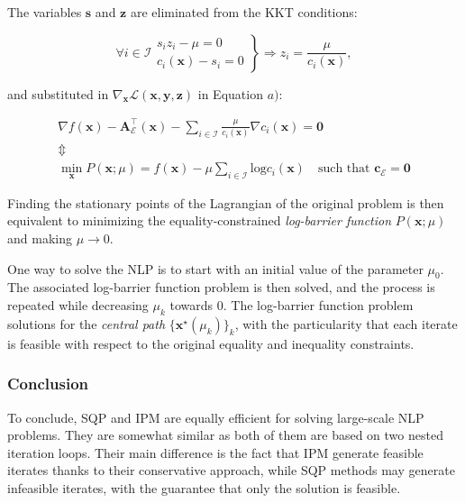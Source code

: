 The variables $\mathbf{s}$ and $\mathbf{z}$ are eliminated from the
KKT conditions:

\begin{equation}
\forall i \in \mathcal{I}
\left.\begin{array}{r}
s_iz_i - \mu = 0\\
c_i(\mathbf{x})-s_i = 0
\end{array}\right\}
\Rightarrow
z_i=\frac{\mu}{c_i(\mathbf{x})},
\end{equation}

and substituted in
$\nabla_{\mathbf{x}}\mathcal{L}(\mathbf{x},\mathbf{y},\mathbf{z})$
in Equation $a)$:

\begin{equation}
\begin{array}{c}
\nabla f(\mathbf{x}) - \mathbf{A}_{\mathcal{E}}^{\top}(\mathbf{x}) -
\sum_{i\in\mathcal{I}}\frac{\mu}{c_i(\mathbf{x})}\nabla
c_i(\mathbf{x})=\mathbf{0} \\
\Updownarrow \\
\min_{\mathbf{x}}P(\mathbf{x};\mu)=f(\mathbf{x}) -
\mu\sum_{i\in\mathcal{I}}\text{log}c_i(\mathbf{x}) \quad\text{
  such that }\mathbf{c_{\mathcal{E}}=\mathbf{0}}
\end{array}
\end{equation}

Finding the stationary points of the Lagrangian of the original
problem is then equivalent to minimizing the equality-constrained
\emph{log-barrier function} $P(\mathbf{x};\mu)$ and making $\mu
\rightarrow 0$.

One way to solve the NLP is to start with an initial value of the
parameter $\mu_0$. The associated log-barrier function problem is then
solved, and the process is repeated while decreasing $\mu_k$ towards
0. The log-barrier function problem solutions for the \emph{central
  path} $\{\mathbf{x}^\star(\mu_k)\}_k$, with the particularity that
each iterate is feasible with respect to the original equality and
inequality constraints.

\subsubsection{Conclusion}

To conclude, SQP and IPM are equally efficient for solving large-scale
NLP problems. They are somewhat similar as both of them are based on
two nested iteration loops. Their main difference is the fact that IPM
generate feasible iterates thanks to their conservative approach,
while SQP methods may generate infeasible iterates, with the guarantee
that only the solution is feasible.

